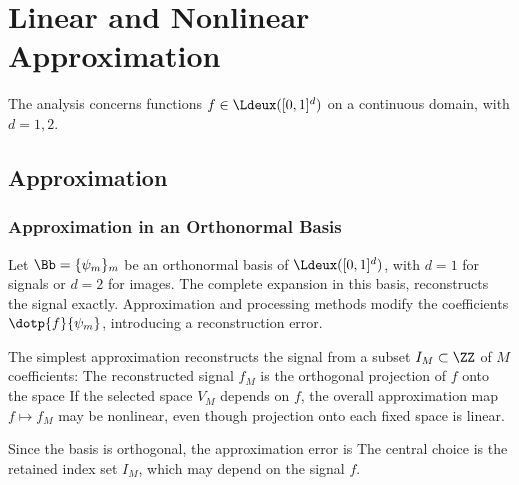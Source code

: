 
\chapter{Linear and Nonlinear Approximation}
\label{chap-approx}\label{chap-approximation}


The analysis concerns functions $f \in \Ldeux([0,1]^d)$ on a continuous domain, with $d=1,2$.


\section{Approximation}

\subsection{Approximation in an Orthonormal Basis}

Let $\Bb = \{ \psi_m \}_m$ be an orthonormal basis of $\Ldeux([0,1]^d)$, with $d=1$ for signals or $d=2$ for images.
The complete expansion in this basis,
reconstructs the signal exactly. Approximation and processing methods modify the coefficients $\dotp{f}{\psi_m}$, introducing a reconstruction error.

The simplest approximation reconstructs the signal from a subset $I_M \subset \ZZ$ of $M$ coefficients:
The reconstructed signal $f_M$ is the orthogonal projection of $f$ onto the space
If the selected space $V_M$ depends on $f$, the overall approximation map $f \mapsto f_M$ may be nonlinear, even though projection onto each fixed space is linear.

Since the basis is orthogonal, the approximation error is 
The central choice is the retained index set $I_M$, which may depend on the signal $f$.


